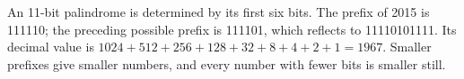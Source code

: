 An 11-bit palindrome is determined by its first six bits. The prefix of 2015 is 111110; the preceding possible prefix is 111101, which reflects to 11110101111. Its decimal value is $ 1024+512+256+128+32+8+4+2+1=\boxed{1967}$. Smaller prefixes give smaller numbers, and every number with fewer bits is smaller still.
